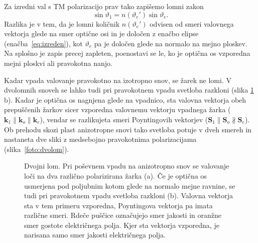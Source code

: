 Za izredni val s TM polarizacijo 
prav tako zapišemo lomni zakon
\begin{equation}
\sin\vartheta_{1}=n(\vartheta_e')\sin\vartheta_{e}.
\end{equation}
Razlika je v tem, da je lomni količnik $n(\vartheta_e')$ odvisen od smeri valovnega vektorja glede na smer optične osi
in je določen z enačbo elipse (enačba~\ref{eq:izreden}), kot $\vartheta_e$ pa je določen glede na
normalo na mejno ploskev. Na splošno je zapis precej zapleten, poenostavi se le, 
ko je optična os vzporedna mejni ploskvi ali pravokotna nanjo. 

Kadar vpada valovanje pravokotno na izotropno snov, se žarek ne lomi. V 
dvolomnih snoveh se lahko tudi pri pravokotnem vpadu svetloba razkloni (slika
\ref{fig:dvolomnost}\,b). Kadar je optična os nagnjena glede na vpadnico, sta valovna vektorja
obeh prepuščenih žarkov sicer vzporedna valovnemu vektorju vpadnega žarka ($\mathbf{k}_1 \parallel
\mathbf{k}_o \parallel \mathbf{k}_e$), vendar se razlikujeta smeri Poyntingovih vektorjev
($\mathbf{S}_1 \parallel \mathbf{S}_o \nparallel \mathbf{S}_e$). Ob prehodu skozi 
plast anizotropne snovi tako svetloba potuje v dveh smereh in nastaneta dve sliki 
z medsebojno pravokotnima polarizacijama (slika~\ref{foto:dvolom}). 

\begin{figure}[ht]
\centering
\def\svgwidth{140truemm} 

\caption{Dvojni lom. Pri poševnem vpadu na anizotropno snov se
valovanje loči na dva različno polarizirana žarka (a). Če je optična os 
usmerjena pod poljubnim kotom glede na normalo mejne ravnine, se tudi pri pravokotnem vpadu
svetloba razkloni (b). Valovna vektorja sta v tem primeru vzporedna, 
Poyntingova vektorja pa imata različne smeri. Rdeče puščice označujejo smer
jakosti in oranžne smer gostote električnega polja. Kjer sta vektorja vzporedna, je narisana
samo smer jakosti električnega polja.}
\label{fig:dvolomnost}
\end{figure}

